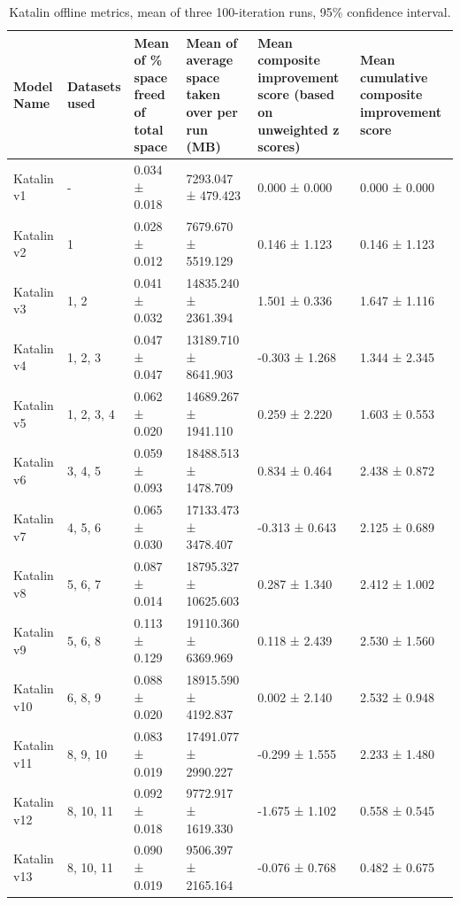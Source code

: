 \documentclass{article}
\begin{document}
\begin{table}[H]
\setlength{\tabcolsep}{3pt}
\renewcommand{\arraystretch}{1.3}
\footnotesize
\begin{tabularx}{\textwidth}{|L|L|L|L|L|L|}
    \hline
    \textbf{Model Name} & 
    \textbf{Datasets used} & 
    \textbf{Mean of \% space freed of total space} & 
    \textbf{Mean of average space taken over per run (MB)} & 
    \textbf{Mean composite improvement score (based on unweighted z scores)} & 
    \textbf{Mean cumulative composite improvement score} \\ 
    \hline
    Katalin v1 & - & 0.034 ± 0.018 & 7293.047 ± 479.423 & 0.000 ± 0.000 & 0.000 ± 0.000 \\ 
    \hline
    Katalin v2 & 1 & 0.028 ± 0.012 & 7679.670 ± 5519.129 & 0.146 ± 1.123 & 0.146 ± 1.123 \\ 
    \hline
    Katalin v3 & 1, 2 & 0.041 ± 0.032 & 14835.240 ± 2361.394 & 1.501 ± 0.336 & 1.647 ± 1.116 \\ 
    \hline
    Katalin v4 & 1, 2, 3 & 0.047 ± 0.047 & 13189.710 ± 8641.903 & -0.303 ± 1.268 & 1.344 ± 2.345 \\ 
    \hline
    Katalin v5 & 1, 2, 3, 4 & 0.062 ± 0.020 & 14689.267 ± 1941.110 & 0.259 ± 2.220 & 1.603 ± 0.553 \\ 
    \hline
    Katalin v6 & 3, 4, 5 & 0.059 ± 0.093 & 18488.513 ± 1478.709 & 0.834 ± 0.464 & 2.438 ± 0.872 \\ 
    \hline
    Katalin v7 & 4, 5, 6 & 0.065 ± 0.030 & 17133.473 ± 3478.407 & -0.313 ± 0.643 & 2.125 ± 0.689 \\
    \hline
    Katalin v8 & 5, 6, 7 & 0.087 ± 0.014 & 18795.327 ± 10625.603 & 0.287 ± 1.340 & 2.412 ± 1.002 \\
    \hline
    Katalin v9 & 5, 6, 8 & 0.113 ± 0.129 & 19110.360 ± 6369.969 & 0.118 ± 2.439 & 2.530 ± 1.560 \\
    \hline
    Katalin v10 & 6, 8, 9 & 0.088 ± 0.020 & 18915.590 ± 4192.837 & 0.002 ± 2.140 & 2.532 ± 0.948 \\
    \hline
    Katalin v11 & 8, 9, 10 & 0.083 ± 0.019 & 17491.077 ± 2990.227 & -0.299 ± 1.555 & 2.233 ± 1.480 \\
    \hline
    Katalin v12 & 8, 10, 11 & 0.092 ± 0.018 & 9772.917 ± 1619.330 & -1.675 ± 1.102 & 0.558 ± 0.545 \\
    \hline
    Katalin v13 & 8, 10, 11 & 0.090 ± 0.019 & 9506.397 ± 2165.164 & -0.076 ± 0.768 & 0.482 ± 0.675 \\
    \hline
\end{tabularx}
\caption{Katalin offline metrics, mean of three 100-iteration runs, 95\% confidence interval.}
\label{tab:katalin_offline_metrics}
\end{table}
\end{document}
